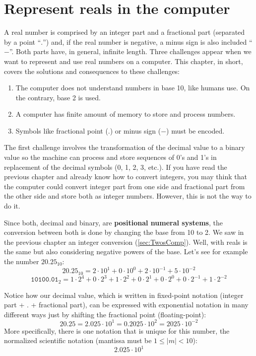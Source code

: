     \section{Represent reals in the computer}
 
A real number is comprised by an integer part and a fractional part (separated by a point ``$.$'') and, if the real number is negative, a minus sign is also included ``$-$''.
Both parts have, in general, infinite length. 
Three challenges appear when we want to represent and use real numbers on a computer. 
This chapter, in short, covers the solutions and consequences to these challenges:
\begin{enumerate}
    \item The computer does not understand numbers in base 10, like humans use. On the contrary, base 2 is used. 
    \item A computer has finite amount of memory to store and process numbers.
    \item Symbols like fractional point ($.$) or minus sign ($-$) must be encoded. 
\end{enumerate}
 
The first challenge involves the transformation of the decimal value to a binary value so the machine can process and store sequences of 0's and 1's in replacement of the decimal symbols (0, 1, 2, 3, etc.).
If you have read the previous chapter and already know how to convert integers, you may think that the computer could convert integer part from one side and fractional part from the other side and store both as integer numbers. However, this is not the way to do it. 

Since both, decimal and binary, are \textbf{positional numeral systems}, the conversion between both is done by changing the base from 10 to 2. 
We saw in the previous chapter an integer conversion (\ref{sec:TwosComp}). Well, with reals is the same but also considering negative powers of the base. 
Let's see for example the number $20.25_{10}$:
$$
20.25_{10} = 2\cdot 10^1 + 0\cdot 10^0+ 2\cdot 10^{-1}+ 5\cdot 10^{-2}
$$
$$
\texttt{10100.01}_{2} = 1\cdot 2^4 +0\cdot 2^3+ 1\cdot 2^2+ 0\cdot 2^1+ 0\cdot 2^0+ 0\cdot 2^{-1}+  1\cdot 2^{-2} 
$$

Notice how our decimal value, which is written in fixed-point notation (integer part + . + fractional part), can be expressed with exponential notation in many different ways just by shifting the fractional point (floating-point):
$$
20.25 = 2.025\cdot10^1 = 0.2025\cdot10^2 = 2025\cdot10^{-2}
$$
More specifically, there is one notation that is unique for this number, the normalized scientific notation (mantissa must be $1\leq\mid m \mid < 10$):
$$
2.025\cdot10^1
$$

